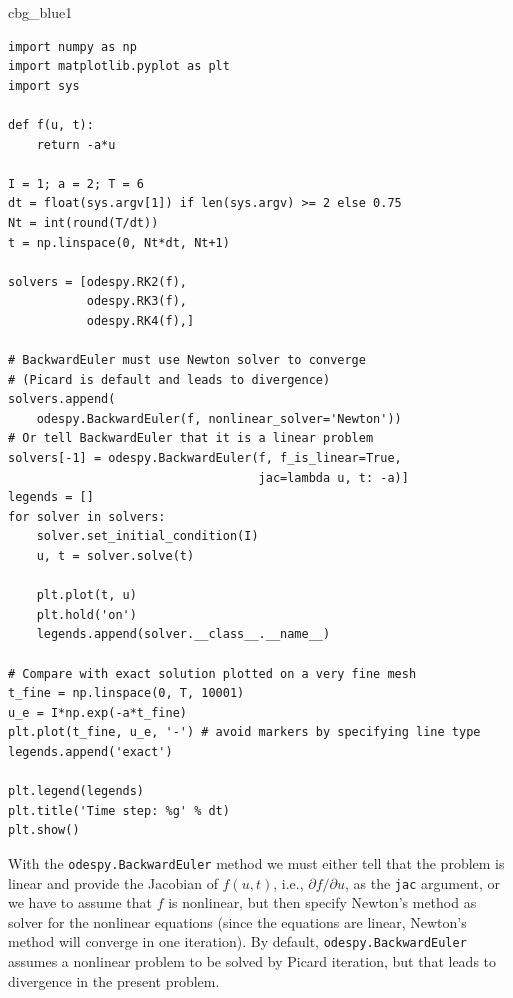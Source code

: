 \documentclass[%
oneside,                 %
final,                   %
10pt]{article}
\newenvironment{_cod_tight}[1]{
   \def\FrameCommand{\colorbox{#1}}
   \FrameRule0.6pt\MakeFramed {\FrameRestore}\vskip3mm}
   {\vskip0mm\endMakeFramed}
\newenvironment{cod}[1]{
\bgroup\rmfamily
\fboxsep=0mm\relax
\begin{_cod_tight}{#1}
\list{}{\parsep=-2mm\parskip=0mm\topsep=0pt\leftmargin=2mm
\rightmargin=2\leftmargin\leftmargin=4pt\relax}
\item\relax}
{\endlist\end{_cod_tight}\egroup}
\begin{document}
\begin{cod}{cbg_blue1}\begin{Verbatim}[numbers=none,fontsize=\fontsize{9pt}{9pt},baselinestretch=0.95,xleftmargin=2mm]
import numpy as np
import matplotlib.pyplot as plt
import sys

def f(u, t):
    return -a*u

I = 1; a = 2; T = 6
dt = float(sys.argv[1]) if len(sys.argv) >= 2 else 0.75
Nt = int(round(T/dt))
t = np.linspace(0, Nt*dt, Nt+1)

solvers = [odespy.RK2(f),
           odespy.RK3(f),
           odespy.RK4(f),]

# BackwardEuler must use Newton solver to converge
# (Picard is default and leads to divergence)
solvers.append(
    odespy.BackwardEuler(f, nonlinear_solver='Newton'))
# Or tell BackwardEuler that it is a linear problem
solvers[-1] = odespy.BackwardEuler(f, f_is_linear=True,
                                   jac=lambda u, t: -a)]
legends = []
for solver in solvers:
    solver.set_initial_condition(I)
    u, t = solver.solve(t)

    plt.plot(t, u)
    plt.hold('on')
    legends.append(solver.__class__.__name__)

# Compare with exact solution plotted on a very fine mesh
t_fine = np.linspace(0, T, 10001)
u_e = I*np.exp(-a*t_fine)
plt.plot(t_fine, u_e, '-') # avoid markers by specifying line type
legends.append('exact')

plt.legend(legends)
plt.title('Time step: %g' % dt)
plt.show()
\end{Verbatim}
\end{cod}
\noindent
With the \texttt{odespy.BackwardEuler} method we must either tell that
the problem is linear and provide the Jacobian of $f(u,t)$, i.e.,
$\partial f/\partial u$, as the \texttt{jac} argument, or we have to assume
that $f$ is nonlinear, but then specify Newton's method as solver
for the nonlinear equations (since the equations are linear, Newton's
method will converge in one iteration). By default,
\texttt{odespy.BackwardEuler} assumes a nonlinear problem to be solved by
Picard iteration, but that leads to divergence in the present problem.
\end{document}
